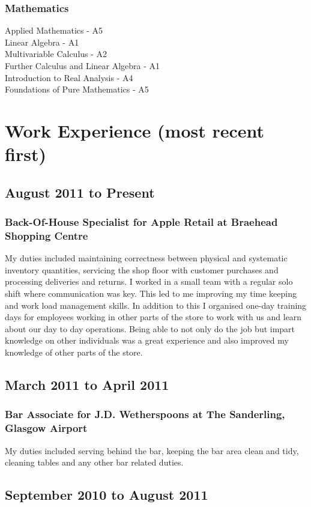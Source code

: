 \documentclass[10pt,a4paper]{article}
\begin{document}
\subsubsection*{Mathematics}
Applied Mathematics - A5\\
Linear Algebra - A1\\
Multivariable Calculus - A2\\
Further Calculus and Linear Algebra - A1\\
Introduction to Real Analysis - A4\\
Foundations of Pure Mathematics - A5\\
\pagebreak
\section*{Work Experience (most recent first)}
\subsection*{August 2011 to Present}
\subsubsection*{Back-Of-House Specialist for Apple Retail at Braehead Shopping Centre}
My duties included maintaining correctness between physical and systematic inventory quantities, servicing the shop floor with customer purchases and processing deliveries and returns. I worked in a small team with a regular solo shift where communication was key. This led to me improving my time keeping and work load management skills. In addition to this I organised one-day training days for employees working in other parts of the store to work with us and learn about our day to day operations. Being able to not only do the job but impart knowledge on other individuals was a great experience and also improved my knowledge of other parts of the store.
\subsection*{March 2011 to April 2011}
\subsubsection*{Bar Associate for J.D. Wetherspoons at The Sanderling, Glasgow Airport}
My duties included serving behind the bar, keeping the bar area clean and tidy, cleaning tables and any other bar related duties.
\subsection*{September 2010 to August 2011}
\end{document}
